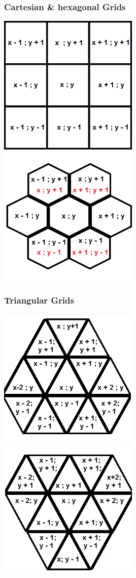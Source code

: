 \documentclass{beamer}
\begin{document}
\begin{frame}
\frametitle{Cartesian \& hexagonal Grids}
\includegraphics[width=0.5\textwidth]{imgs/cartesian.png}
\includegraphics[width=0.5\textwidth]{imgs/hexagonal.png}
\end{frame}

\begin{frame}
\frametitle{Triangular Grids}
\includegraphics[width=0.5\textwidth]{imgs/triangle1.png}
\includegraphics[width=0.5\textwidth]{imgs/triangle2.png}
\end{frame}
\end{document}
